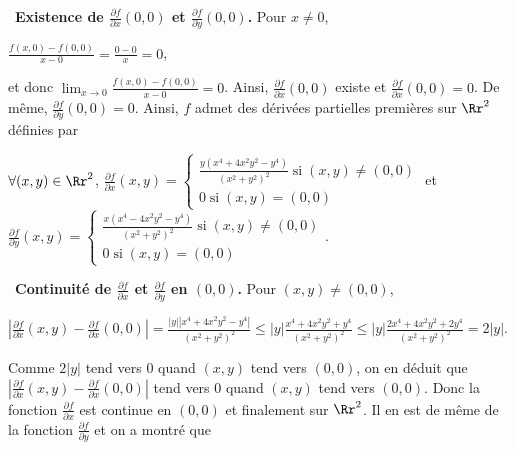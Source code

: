 {{\textbullet~\textbf{Existence de $ \frac{\partial f}{\partial x}(0,0)$ et $ \frac{\partial f}{\partial y}(0,0)$.} Pour $x\neq0$,

\begin{center}
$ \frac{f(x,0)-f(0,0)}{x-0}= \frac{0-0}{x}=0$,
\end{center}

et donc $\lim_{x \rightarrow 0} \frac{f(x,0)-f(0,0)}{x-0}=0$. Ainsi, $ \frac{\partial f}{\partial x}(0,0)$ existe et $ \frac{\partial f}{\partial x}(0,0)=0$. De même, $ \frac{\partial f}{\partial y}(0,0)=0$. Ainsi, $f$ admet des dérivées partielles premières sur $\Rr^2$ définies par

\begin{center}
$\forall(x,y)\in\Rr^2$, $ \frac{\partial f}{\partial x}(x,y)=\left\{
\begin{array}{l}
 \frac{y(x^4+4x^2y^2-y^4)}{(x^2+y^2)^2}\;\text{si}\;(x,y)\neq(0,0)\\
0\;\text{si}\;(x,y)=(0,0)
\end{array}
\right.$ et $ \frac{\partial f}{\partial y}(x,y)=\left\{
\begin{array}{l}
 \frac{x(x^4-4x^2y^2-y^4)}{(x^2+y^2)^2}\;\text{si}\;(x,y)\neq(0,0)\\
0\;\text{si}\;(x,y)=(0,0)
\end{array}
\right.$.
\end{center}

\textbullet~\textbf{Continuité de $ \frac{\partial f}{\partial x}$ et $ \frac{\partial f}{\partial y}$ en $(0,0)$.} Pour $(x,y)\neq(0,0)$,

\begin{center}
$\left| \frac{\partial f}{\partial x}(x,y)- \frac{\partial f}{\partial x}(0,0)\right|= \frac{|y||x^4+4x^2y^2-y^4|}{(x^2+y^2)^2}\leqslant|y| \frac{x^4+4x^2y^2+y^4}{(x^2+y^2)^2}\leqslant|y| \frac{2x^4+4x^2y^2+2y^4}{(x^2+y^2)^2}=2|y|$.
\end{center}

Comme $2|y|$ tend vers $0$ quand $(x,y)$ tend vers $(0,0)$, on en déduit que $\left| \frac{\partial f}{\partial x}(x,y)- \frac{\partial f}{\partial x}(0,0)\right|$ tend vers $0$ quand $(x,y)$ tend vers $(0,0)$. Donc la fonction $ \frac{\partial f}{\partial x}$ est continue en $(0,0)$ et finalement sur $\Rr^2$. Il en est de même de la fonction $ \frac{\partial f}{\partial y}$ et on a montré que

\begin{center}
\end{center}
}
}
